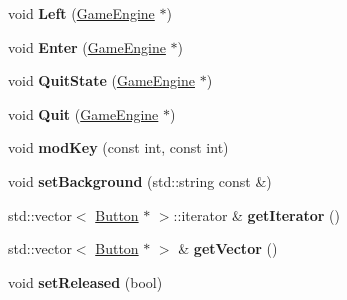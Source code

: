 \begin{DoxyCompactItemize}
\item 
\hypertarget{class_option_state_abb8f62d76d866ca54526a061fc43aee8}{}void {\bfseries Left} (\hyperlink{class_game_engine}{Game\+Engine} $\ast$)\label{class_option_state_abb8f62d76d866ca54526a061fc43aee8}

\item 
\hypertarget{class_option_state_a675ca52a720c8643e19a19fa829fee6e}{}void {\bfseries Enter} (\hyperlink{class_game_engine}{Game\+Engine} $\ast$)\label{class_option_state_a675ca52a720c8643e19a19fa829fee6e}

\item 
\hypertarget{class_option_state_a5884faa014fba18934f771108b10837b}{}void {\bfseries Quit\+State} (\hyperlink{class_game_engine}{Game\+Engine} $\ast$)\label{class_option_state_a5884faa014fba18934f771108b10837b}

\item 
\hypertarget{class_option_state_a3c4776fb5fce2d72059e1c0e80c5be32}{}void {\bfseries Quit} (\hyperlink{class_game_engine}{Game\+Engine} $\ast$)\label{class_option_state_a3c4776fb5fce2d72059e1c0e80c5be32}

\item 
\hypertarget{class_option_state_a930a3c9eb1ce10b6dd108bb7e43b6810}{}void {\bfseries mod\+Key} (const int, const int)\label{class_option_state_a930a3c9eb1ce10b6dd108bb7e43b6810}

\item 
\hypertarget{class_option_state_ad40900ba95c9e8bc3f2c6b0b0fe53423}{}void {\bfseries set\+Background} (std\+::string const \&)\label{class_option_state_ad40900ba95c9e8bc3f2c6b0b0fe53423}

\item 
\hypertarget{class_option_state_a82a43370fecc6b72a81e6e710c853058}{}std\+::vector$<$ \hyperlink{class_button}{Button} $\ast$ $>$\+::iterator \& {\bfseries get\+Iterator} ()\label{class_option_state_a82a43370fecc6b72a81e6e710c853058}

\item 
\hypertarget{class_option_state_afc26eea31c2bc2e5133df913a4cd06b2}{}std\+::vector$<$ \hyperlink{class_button}{Button} $\ast$ $>$ \& {\bfseries get\+Vector} ()\label{class_option_state_afc26eea31c2bc2e5133df913a4cd06b2}

\item 
\hypertarget{class_option_state_a12e58059c0349d0bd4e87c1e96e1e991}{}void {\bfseries set\+Released} (bool)\label{class_option_state_a12e58059c0349d0bd4e87c1e96e1e991}

\end{DoxyCompactItemize}
